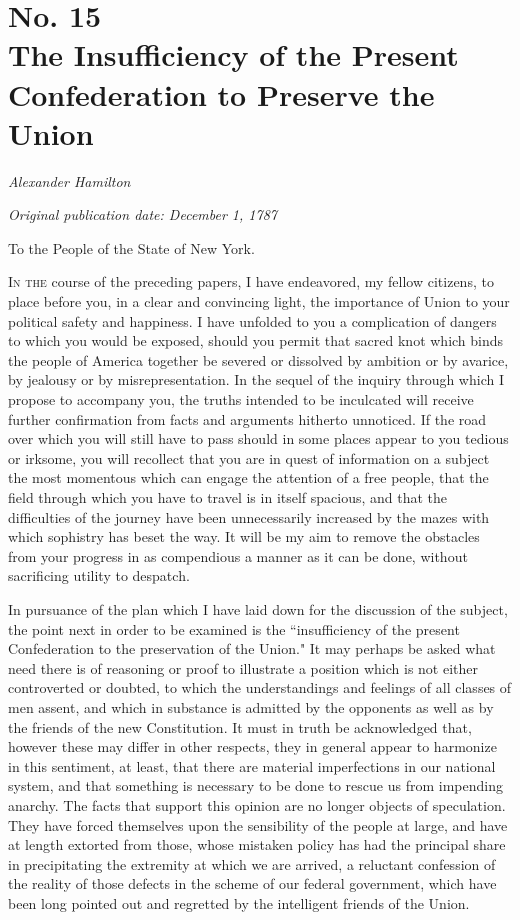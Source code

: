 \chapter[No. 15: The Insufficiency of the Present Confederation to Preserve the Union]{No. 15\\ {\small The Insufficiency of the Present Confederation to Preserve the Union}}

\textit{Alexander Hamilton}

\textit{Original publication date: December 1, 1787}
\vspace{1cm}

To the People of the State of New York.
\vspace{.4cm}

\textsc{In the} course of the preceding papers, I have endeavored, my fellow citizens, to place before you, in a clear and convincing light, the importance of Union to your political safety and happiness. 
I have unfolded to you a complication of dangers to which you would be exposed, should you permit that sacred knot which binds the people of America together be severed or dissolved by ambition or by avarice, by jealousy or by misrepresentation. 
In the sequel of the inquiry through which I propose to accompany you, the truths intended to be inculcated will receive further confirmation from facts and arguments hitherto unnoticed. 
If the road over which you will still have to pass should in some places appear to you tedious or irksome, you will recollect that you are in quest of information on a subject the most momentous which can engage the attention of a free people, that the field through which you have to travel is in itself spacious, and that the difficulties of the journey have been unnecessarily increased by the mazes with which sophistry has beset the way. 
It will be my aim to remove the obstacles from your progress in as compendious a manner as it can be done, without sacrificing utility to despatch.

In pursuance of the plan which I have laid down for the discussion of the subject, the point next in order to be examined is the ``insufficiency of the present Confederation to the preservation of the Union." It may perhaps be asked what need there is of reasoning or proof to illustrate a position which is not either controverted or doubted, to which the understandings and feelings of all classes of men assent, and which in substance is admitted by the opponents as well as by the friends of the new Constitution. 
It must in truth be acknowledged that, however these may differ in other respects, they in general appear to harmonize in this sentiment, at least, that there are material imperfections in our national system, and that something is necessary to be done to rescue us from impending anarchy. 
The facts that support this opinion are no longer objects of speculation. 
They have forced themselves upon the sensibility of the people at large, and have at length extorted from those, whose mistaken policy has had the principal share in precipitating the extremity at which we are arrived, a reluctant confession of the reality of those defects in the scheme of our federal government, which have been long pointed out and regretted by the intelligent friends of the Union.

